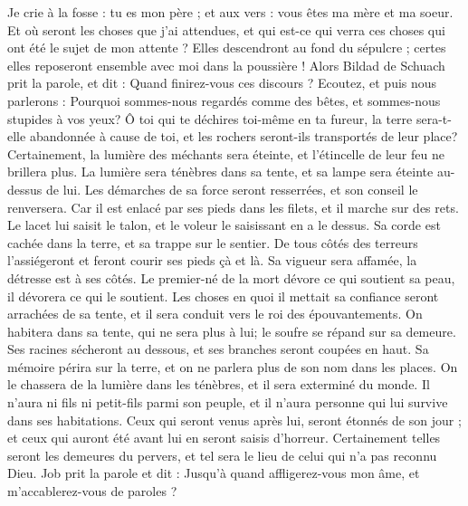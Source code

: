 \begin{multicols}{2}
{Je crie à la fosse : tu es mon père ; et aux vers : vous êtes ma mère et ma soeur. 
Et où seront les choses que j'ai attendues, et qui est-ce qui verra ces choses qui ont été le sujet de mon attente ?
Elles descendront au fond du sépulcre ; certes elles reposeront ensemble avec moi dans la poussière ! 
\VerseOne{}Alors Bildad de Schuach prit la parole, et dit :
Quand finirez-vous ces discours ? Ecoutez, et puis nous parlerons :
Pourquoi sommes-nous regardés comme des bêtes, et sommes-nous stupides à vos yeux? 
Ô toi qui te déchires toi-même en ta fureur, la terre sera-t-elle abandonnée à cause de toi, et les rochers seront-ils transportés de leur place? 
Certainement, la lumière des méchants sera éteinte, et l'étincelle de leur feu ne brillera plus.
La lumière sera ténèbres dans sa tente, et sa lampe sera éteinte au-dessus de lui. 
Les démarches de sa force seront resserrées, et son conseil le renversera.
Car il est enlacé par ses pieds dans les filets, et il marche sur des rets.
Le lacet lui saisit le talon, et le voleur le saisissant en a le dessus. 
Sa corde est cachée dans la terre, et sa trappe sur le sentier. 
De tous côtés des terreurs l'assiégeront et feront courir ses pieds çà et là.
Sa vigueur sera affamée, la détresse est à ses côtés.
Le premier-né de la mort dévore ce qui soutient sa peau, il dévorera ce qui le soutient. 
 Les choses en quoi il mettait sa confiance seront arrachées de sa tente, et il sera conduit vers le roi des épouvantements. 
On habitera dans sa tente, qui ne sera plus à lui; le soufre se répand sur sa demeure. 
Ses racines sécheront au dessous, et ses branches seront coupées en haut. 
Sa mémoire périra sur la terre, et on ne parlera plus de son nom dans les places.
On le chassera de la lumière dans les ténèbres, et il sera exterminé du monde. 
Il n'aura ni fils ni petit-fils parmi son peuple, et il n'aura personne qui lui survive dans ses habitations. 
Ceux qui seront venus après lui, seront étonnés de son jour ; et ceux qui auront été avant lui en seront saisis d'horreur. 
Certainement telles seront les demeures du pervers, et tel sera le lieu de celui qui n'a pas reconnu Dieu.
\VerseOne{}Job prit la parole et dit :
Jusqu'à quand affligerez-vous mon âme, et m'accablerez-vous de paroles ? 
}
\end{multicols}
